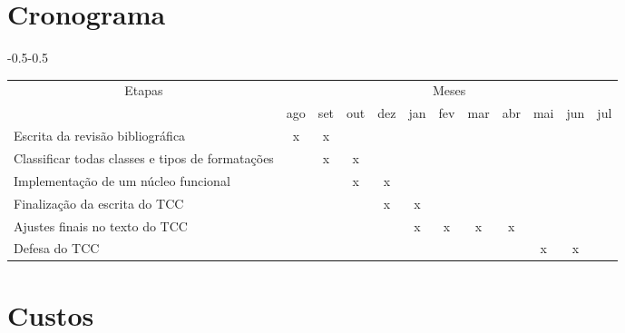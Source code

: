 


\section{Cronograma}

    \begin{adjustwidth}{-0.5\marginparwidth}{-0.5\marginparwidth}
    \small
    \begin{tabularx}{\linewidth}{|X|*{11}{c|}}

        \hline
        \multicolumn{1}{|c|}{\multirow{2}{*}{Etapas}} & \multicolumn{11}{|c|}{Meses} \\
        \cline{2-12}

        & ago & set & out & dez & jan & fev & mar & abr & mai & jun & jul   \\ \hline

        Escrita da revisão bibliográfica
        &  x  &  x  &     &     &     &     &     &     &     &     &     \\ \hline

        Classificar todas classes e tipos de formatações
        &     &  x  &  x  &     &     &     &     &     &     &     &     \\ \hline

        Implementação de um núcleo funcional
        &     &     &  x  &  x  &     &     &     &     &     &     &     \\ \hline

        Finalização da escrita do TCC
        &     &     &     &  x  &  x  &     &     &     &     &     &     \\ \hline

        Ajustes finais no texto do TCC
        &     &     &     &     &  x  &  x  &  x  &  x  &     &     &     \\ \hline

        Defesa do TCC
        &     &     &     &     &     &     &     &     &  x  &  x  &     \\ \hline

    \end{tabularx}
    \end{adjustwidth}
    \hfill\cite{Silva}


\section{Custos}

